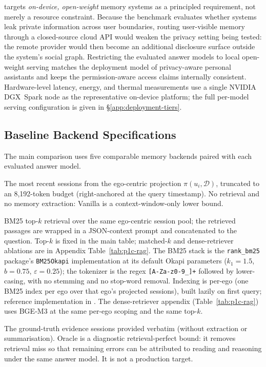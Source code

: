 \benchmark targets \emph{on-device, open-weight} memory systems as a principled requirement, not merely a resource constraint. Because the benchmark evaluates whether systems leak private information across user boundaries, routing user-visible memory through a closed-source cloud API would weaken the privacy setting being tested: the remote provider would then become an additional disclosure surface outside the system's social graph. Restricting the evaluated answer models to local open-weight serving matches the deployment model of privacy-aware personal assistants and keeps the permission-aware access claims internally consistent. Hardware-level latency, energy, and thermal measurements use a single NVIDIA DGX~Spark node as the representative on-device platform; the full per-model serving configuration is given in \S\ref{app:deployment-tiers}.

\subsection{Baseline Backend Specifications}
\label{app:backend-specs}

The main comparison uses five comparable memory backends paired with each evaluated answer model.

 The most recent sessions from the ego-centric projection $\pi(u_i,\mathcal{D})$, truncated to an 8{,}192-token budget (right-anchored at the query timestamp). No retrieval and no memory extraction: Vanilla is a context-window-only lower bound.

 BM25 top-$k$ retrieval over the same ego-centric session pool; the retrieved passages are wrapped in a JSON-context prompt and concatenated to the question. Top-$k$ is fixed in the main table; matched-$k$ and dense-retriever ablations are in Appendix Table~\ref{tab:p1c-rag}. The BM25 stack is the \texttt{rank\_bm25} package's \texttt{BM25Okapi} implementation at its default Okapi parameters ($k_1{=}1.5$, $b{=}0.75$, $\varepsilon{=}0.25$); the tokenizer is the regex \texttt{[A-Za-z0-9\_]+} followed by lower-casing, with no stemming and no stop-word removal. Indexing is per-ego (one BM25 index per ego over that ego's projected sessions), built lazily on first query; reference implementation in . The dense-retriever appendix (Table~\ref{tab:p1c-rag}) uses BGE-M3 at the same per-ego scoping and the same top-$k$.

 The ground-truth evidence sessions provided verbatim (without extraction or summarisation). Oracle is a diagnostic retrieval-perfect bound: it removes retrieval miss so that remaining errors can be attributed to reading and reasoning under the same answer model. It is not a production target.

